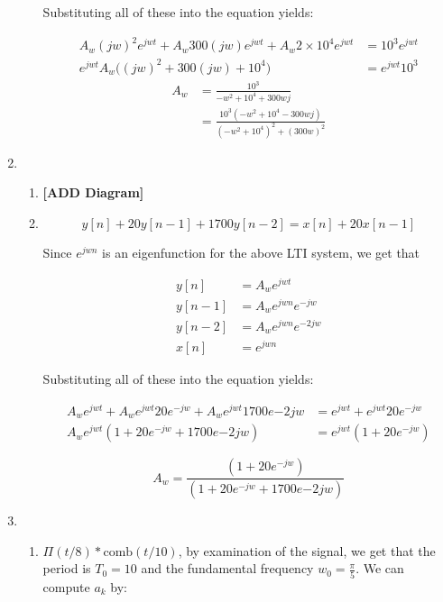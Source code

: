 \documentclass[]{article}
\begin{document}
\begin{enumerate}
\begin{enumerate}
    Substituting all of these into the equation yields:

    \begin{align*}
        A_w (jw)^2 e^{jwt} + A_w 300 (jw) e^{jwt} + A_w 2 \times 10^4 e^{jwt} &= 
            10^3 e^{jwt} \\
        e^{jwt} A_w \Big( (jw)^2 + 300(jw) + 10^4 \Big) &= e^{jwt} 10^3
    \end{align*}\begin{align*}
        A_w &= \frac{10^3}{-w^2 + 10^4 + 300 w j} \\
            &= \boxed{\frac{10^3 (-w^2 + 10^4 - 300wj)}{ (-w^2 + 10^4)^2 + (300 w)^2}}
    \end{align*}
  \end{enumerate}
\item
  \begin{enumerate}
  \def\labelenumii{\alph{enumii}.}
  \item
    \textbf{{[}ADD Diagram{]}}
  \item
    \[
        y[n] + 20 y[n - 1] + 1700 y[n - 2] = x[n] + 20x[n-1]
    \]

    Since \(e^{jwn}\) is an eigenfunction for the above LTI system, we
    get that

    \begin{align*}
        y[n] &= A_w e^{jwt} \\
        y[n - 1] &= A_w e^{jwn} e^{-jw} \\
        y[n - 2] &= A_w  e^{jwn} e^{-2jw} \\
        x[n] &= e^{jwn}
    \end{align*}

    Substituting all of these into the equation yields:

    \begin{align*}
        A_w e^{jwt} + A_w e^{jwt}20  e^{-jw} + A_w e^{jwt} 1700 e{-2jw} &= 
            e^{jwt} + e^{jwt} 20 e^{-jw} \\
        A_w e^{jwt}(1 +  20  e^{-jw} + 1700 e{-2jw}) &=
            e^{jwt}(1 + 20e^{-jw})
    \end{align*}

    \[
        \boxed{A_w = \frac{(1 + 20e^{-jw})}{(1 +  20  e^{-jw} + 1700 e{-2jw})}}
    \]
  \end{enumerate}
\item
  \begin{enumerate}
  \def\labelenumii{\alph{enumii}.}
  \item
    \(\Pi(t / 8) * \text{comb}(t / 10)\), by examination of the signal,
    we get that the period is \(T_0 = 10\) and the fundamental frequency
    \(\boxed{w_0 = \frac{\pi}{5}}\). We can compute \(a_k\) by:


\end{enumerate}
\end{enumerate}
\end{document}
